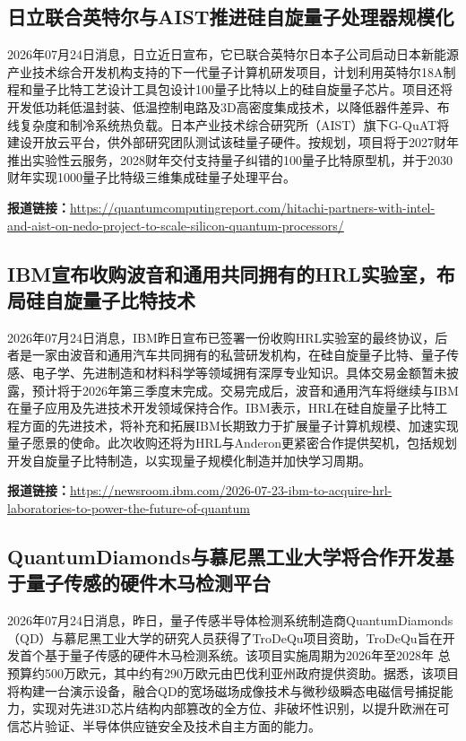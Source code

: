\documentclass[12pt,a4paper]{ctexart}
\begin{document}
\subsection{ 日立联合英特尔与AIST推进硅自旋量子处理器规模化 }

2026年07月24日消息，日立近日宣布，它已联合英特尔日本子公司启动日本新能源产业技术综合开发机构支持的下一代量子计算机研发项目，计划利用英特尔18A制程和量子比特工艺设计工具包设计100量子比特以上的硅自旋量子芯片。项目还将开发低功耗低温封装、低温控制电路及3D高密度集成技术，以降低器件差异、布线复杂度和制冷系统热负载。日本产业技术综合研究所（AIST）旗下G-QuAT将建设开放云平台，供外部研究团队测试该硅量子硬件。按规划，项目将于2027财年推出实验性云服务，2028财年交付支持量子纠错的100量子比特原型机，并于2030财年实现1000量子比特级三维集成硅量子处理平台。

\noindent\textbf{报道链接：}\url{https://quantumcomputingreport.com/hitachi-partners-with-intel-and-aist-on-nedo-project-to-scale-silicon-quantum-processors/}

\subsection{ IBM宣布收购波音和通用共同拥有的HRL实验室，布局硅自旋量子比特技术 }

2026年07月24日消息，IBM昨日宣布已签署一份收购HRL实验室的最终协议，后者是一家由波音和通用汽车共同拥有的私营研发机构，在硅自旋量子比特、量子传感、电子学、先进制造和材料科学等领域拥有深厚专业知识。具体交易金额暂未披露，预计将于2026年第三季度末完成。交易完成后，波音和通用汽车将继续与IBM在量子应用及先进技术开发领域保持合作。IBM表示，HRL在硅自旋量子比特工程方面的先进技术，将补充和拓展IBM长期致力于扩展量子计算机规模、加速实现量子愿景的使命。此次收购还将为HRL与Anderon更紧密合作提供契机，包括规划开发自旋量子比特制造，以实现量子规模化制造并加快学习周期。

\noindent\textbf{报道链接：}\url{https://newsroom.ibm.com/2026-07-23-ibm-to-acquire-hrl-laboratories-to-power-the-future-of-quantum}

\subsection{ QuantumDiamonds与慕尼黑工业大学将合作开发基于量子传感的硬件木马检测平台 }

2026年07月24日消息，昨日，量子传感半导体检测系统制造商QuantumDiamonds（QD）与慕尼黑工业大学的研究人员获得了TroDeQu项目资助，TroDeQu旨在开发首个基于量子传感的硬件木马检测系统。该项目实施周期为2026年至2028年 总预算约500万欧元，其中约有290万欧元由巴伐利亚州政府提供资助。据悉，该项目将构建一台演示设备，融合QD的宽场磁场成像技术与微秒级瞬态电磁信号捕捉能力，实现对先进3D芯片结构内部篡改的全方位、非破坏性识别，以提升欧洲在可信芯片验证、半导体供应链安全及技术自主方面的能力。
\end{document}
